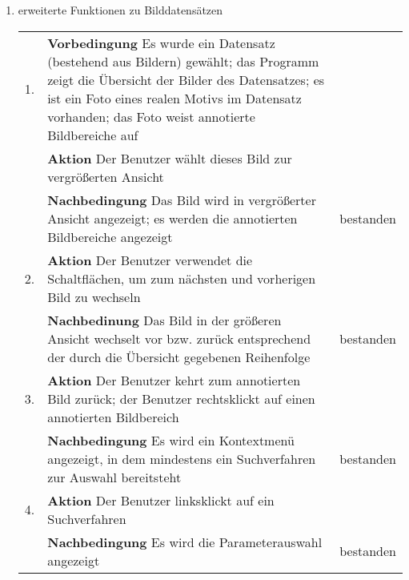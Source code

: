 \begin{enumerate} [label=\bfseries /TS \arabic*0/, leftmargin=*]
	\item erweiterte Funktionen zu Bilddatensätzen \newline \newline
	\begin{tabular}{@{}rp{4in}|l}
	1. & \textbf{Vorbedingung} Es wurde ein Datensatz (bestehend aus Bildern) gewählt; das Programm zeigt die Übersicht der Bilder des Datensatzes; es ist ein Foto eines realen Motivs im Datensatz vorhanden; das Foto weist annotierte Bildbereiche auf & \\
	   & \textbf{Aktion} Der Benutzer wählt dieses Bild zur vergrößerten Ansicht & \\
	   & \textbf{Nachbedingung} Das Bild wird in vergrößerter Ansicht angezeigt; es werden die annotierten Bildbereiche angezeigt & bestanden \\
	\hline
	2. & \textbf{Aktion} Der Benutzer verwendet die Schaltflächen, um zum nächsten und vorherigen Bild zu wechseln & \\
	   & \textbf{Nachbedinung} Das Bild in der größeren Ansicht wechselt vor bzw. zurück entsprechend der durch die Übersicht gegebenen Reihenfolge & bestanden \\
	\hline
	3. & \textbf{Aktion} Der Benutzer kehrt zum annotierten Bild zurück; der Benutzer rechtsklickt auf einen annotierten Bildbereich & \\
	   & \textbf{Nachbedingung} Es wird ein Kontextmenü angezeigt, in dem mindestens ein Suchverfahren zur Auswahl bereitsteht & bestanden \\
	\hline
	4. & \textbf{Aktion} Der Benutzer linksklickt auf ein Suchverfahren & \\
	   & \textbf{Nachbedingung} Es wird die Parameterauswahl angezeigt & bestanden \\
	\end{tabular}
	

\end{enumerate}
